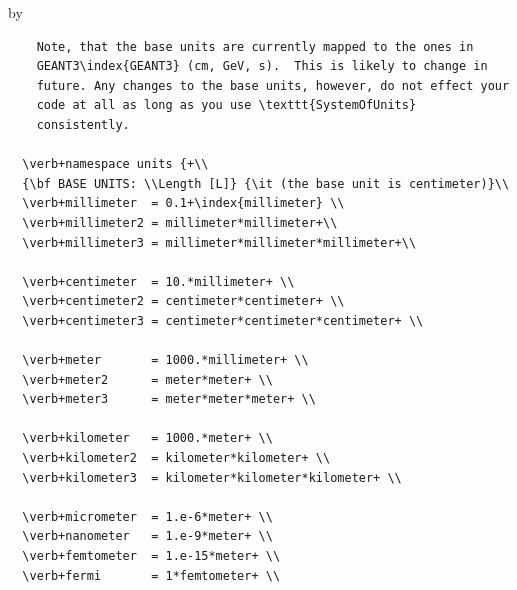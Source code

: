 \documentclass[twoside]{article}
\newcommand{\entrylabel}[1]{\mbox{\textbf{{#1}}}\hfil}%
\newenvironment{entry}
{\begin{list}{}%
    {\renewcommand{\makelabel}{\entrylabel}%
     \setlength{\labelwidth}{90pt}%
     \setlength{\leftmargin}{\labelwidth}
     \advance\leftmargin by \labelsep%
      }%
    }%
  {\end{list}}
\newcommand{\Entrylabel}[1]%
{\raisebox{0pt}[1ex][0pt]{\makebox[\labelwidth][l]%
    {\parbox[t]{\labelwidth}{\hspace{0pt}\textbf{{#1}}}}}}
\newenvironment{Entry}%
{\renewcommand{\entrylabel}{\Entrylabel}\begin{entry}}%
  {\end{entry}}
\begin{document}
\begin{description}
\begin{Entry}
\begin{verbatim}
    Note, that the base units are currently mapped to the ones in
    GEANT3\index{GEANT3} (cm, GeV, s).  This is likely to change in
    future. Any changes to the base units, however, do not effect your
    code at all as long as you use \texttt{SystemOfUnits}
    consistently.
  
  \verb+namespace units {+\\
  {\bf BASE UNITS: \\Length [L]} {\it (the base unit is centimeter)}\\
  \verb+millimeter  = 0.1+\index{millimeter} \\  
  \verb+millimeter2 = millimeter*millimeter+\\
  \verb+millimeter3 = millimeter*millimeter*millimeter+\\

  \verb+centimeter  = 10.*millimeter+ \\
  \verb+centimeter2 = centimeter*centimeter+ \\
  \verb+centimeter3 = centimeter*centimeter*centimeter+ \\

  \verb+meter       = 1000.*millimeter+ \\  
  \verb+meter2      = meter*meter+ \\
  \verb+meter3      = meter*meter*meter+ \\

  \verb+kilometer   = 1000.*meter+ \\
  \verb+kilometer2  = kilometer*kilometer+ \\
  \verb+kilometer3  = kilometer*kilometer*kilometer+ \\

  \verb+micrometer  = 1.e-6*meter+ \\
  \verb+nanometer   = 1.e-9*meter+ \\
  \verb+femtometer  = 1.e-15*meter+ \\
  \verb+fermi       = 1*femtometer+ \\


\end{verbatim}
\end{Entry}
\end{description}
\end{document}
